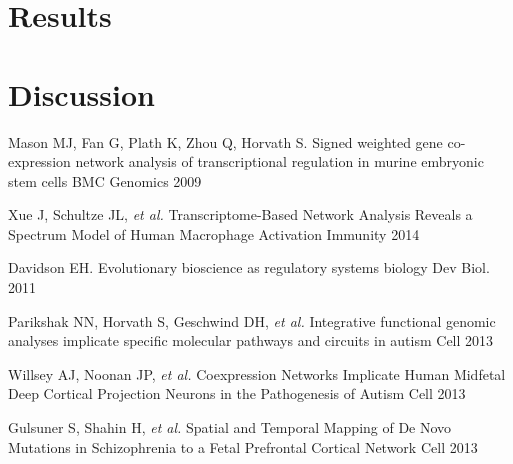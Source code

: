 \documentclass[9pt,twocolumn]{article}
\begin{document}
\section*{Results}


\section*{Discussion}


\begin{thebibliography}{8}

 Mason MJ, Fan G, Plath K, Zhou Q, Horvath S. 
Signed weighted gene co-expression network analysis of transcriptional regulation in murine embryonic stem cells
BMC Genomics
2009

 Xue J,  Schultze JL, \textit{et al.}
Transcriptome-Based Network Analysis Reveals a Spectrum Model of Human Macrophage Activation
Immunity
2014

 Davidson EH.
Evolutionary bioscience as regulatory systems biology
Dev Biol.
2011

 Parikshak NN, Horvath S, Geschwind DH, \textit{et al.}
Integrative functional genomic analyses implicate specific molecular pathways and circuits in autism
Cell
2013

 Willsey AJ, Noonan JP, \textit{et al.}
Coexpression Networks Implicate Human Midfetal Deep Cortical Projection Neurons in the Pathogenesis of Autism
Cell
2013

 Gulsuner S, Shahin H, \textit{et al.}
Spatial and Temporal Mapping of De Novo Mutations in Schizophrenia to a Fetal Prefrontal Cortical Network
Cell
2013
\end{thebibliography}
\end{document}
